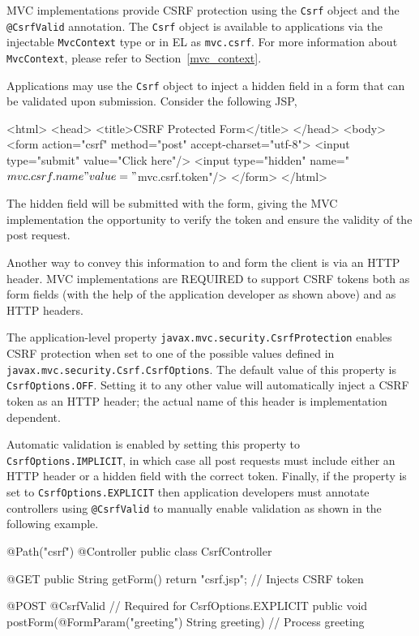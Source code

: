 MVC implementations provide CSRF protection using the {\tt Csrf} object
and the {\tt @CsrfValid} annotation. The {\tt Csrf} object is available to applications
via the injectable {\tt MvcContext} type or in EL as {\tt mvc.csrf}. For more information
about {\tt MvcContext}, please refer to Section~\ref{mvc_context}. 

Applications may use the {\tt Csrf} object to inject a hidden field in a form that can be validated 
upon submission. Consider the following JSP,

\begin{listing}{1}
<html>
<head>
    <title>CSRF Protected Form</title>
</head>
<body>
    <form action="csrf" method="post" accept-charset="utf-8">
        <input type="submit" value="Click here"/>
        <input type="hidden" name="${mvc.csrf.name}" 
                             value="${mvc.csrf.token}"/>
    </form>
</html>
\end{listing}

The hidden field will be submitted with the form, giving the MVC implementation
the opportunity to verify the token and ensure the validity of the post request. 

Another way to convey this information to and form the client is via an HTTP
header. MVC implementations are REQUIRED to support CSRF tokens both
as form fields (with the help of the application developer as shown above) and
as HTTP headers.

The application-level property {\tt javax.mvc.security.CsrfProtection} enables
 CSRF protection when set to one of the possible values defined in
{\tt javax.mvc.security.Csrf.CsrfOptions}. The default value of this property is
{\tt CsrfOptions.OFF}. Setting it to any other value will automatically inject a
CSRF token as an HTTP header; the actual name of this header is 
implementation dependent.

Automatic validation is enabled by setting this
property to {\tt CsrfOptions.IMPLICIT}, in which case all post requests
must include either an HTTP header or a hidden field with the correct token.
Finally, if the property is set to {\tt CsrfOptions.EXPLICIT} then application
developers must annotate controllers using {\tt @CsrfValid} to manually
enable validation  as shown in the following example.

\begin{listing}{1}
@Path("csrf")
@Controller
public class CsrfController {

    @GET
    public String getForm() {
        return "csrf.jsp";     // Injects CSRF token
    }

    @POST
    @CsrfValid		           // Required for CsrfOptions.EXPLICIT
    public void postForm(@FormParam("greeting") String greeting) {
        // Process greeting
    }
}
 \end{listing}

